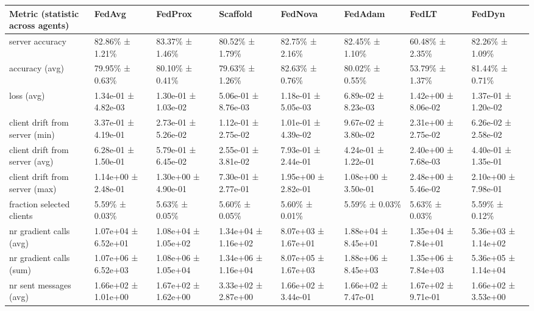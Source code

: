 \begin{tabular}{llllllll}
\hline
 Metric (statistic across agents)   & FedAvg              & FedProx             & Scaffold            & FedNova             & FedAdam             & FedLT               & FedDyn              \\
\hline
 server accuracy                    & 82.86\% ± 1.21\%      & 83.37\% ± 1.46\%      & 80.52\% ± 1.79\%      & 82.75\% ± 2.16\%      & 82.45\% ± 1.10\%      & 60.48\% ± 2.35\%      & 82.26\% ± 1.09\%      \\
 accuracy (avg)                     & 79.95\% ± 0.63\%      & 80.10\% ± 0.41\%      & 79.63\% ± 1.26\%      & 82.63\% ± 0.76\%      & 80.02\% ± 0.55\%      & 53.79\% ± 1.37\%      & 81.44\% ± 0.71\%      \\
 loss (avg)                         & 1.34e-01 ± 4.82e-03 & 1.30e-01 ± 1.03e-02 & 5.06e-01 ± 8.76e-03 & 1.18e-01 ± 5.05e-03 & 6.89e-02 ± 8.23e-03 & 1.42e+00 ± 8.06e-02 & 1.37e-01 ± 1.20e-02 \\
 client drift from server (min)     & 3.37e-01 ± 4.19e-01 & 2.73e-01 ± 5.26e-02 & 1.12e-01 ± 2.75e-02 & 1.01e-01 ± 4.39e-02 & 9.67e-02 ± 3.80e-02 & 2.31e+00 ± 2.75e-02 & 6.26e-02 ± 2.58e-02 \\
 client drift from server (avg)     & 6.28e-01 ± 1.50e-01 & 5.79e-01 ± 6.45e-02 & 2.55e-01 ± 3.81e-02 & 7.93e-01 ± 2.44e-01 & 4.24e-01 ± 1.22e-01 & 2.40e+00 ± 7.68e-03 & 4.40e-01 ± 1.35e-01 \\
 client drift from server (max)     & 1.14e+00 ± 2.48e-01 & 1.30e+00 ± 4.90e-01 & 7.30e-01 ± 2.77e-01 & 1.95e+00 ± 2.82e-01 & 1.08e+00 ± 3.50e-01 & 2.48e+00 ± 5.46e-02 & 2.10e+00 ± 7.98e-01 \\
 fraction selected clients          & 5.59\% ± 0.03\%       & 5.63\% ± 0.05\%       & 5.60\% ± 0.05\%       & 5.60\% ± 0.01\%       & 5.59\% ± 0.03\%       & 5.63\% ± 0.03\%       & 5.59\% ± 0.12\%       \\
 nr gradient calls (avg)            & 1.07e+04 ± 6.52e+01 & 1.08e+04 ± 1.05e+02 & 1.34e+04 ± 1.16e+02 & 8.07e+03 ± 1.67e+01 & 1.88e+04 ± 8.45e+01 & 1.35e+04 ± 7.84e+01 & 5.36e+03 ± 1.14e+02 \\
 nr gradient calls (sum)            & 1.07e+06 ± 6.52e+03 & 1.08e+06 ± 1.05e+04 & 1.34e+06 ± 1.16e+04 & 8.07e+05 ± 1.67e+03 & 1.88e+06 ± 8.45e+03 & 1.35e+06 ± 7.84e+03 & 5.36e+05 ± 1.14e+04 \\
 nr sent messages (avg)             & 1.66e+02 ± 1.01e+00 & 1.67e+02 ± 1.62e+00 & 3.33e+02 ± 2.87e+00 & 1.66e+02 ± 3.44e-01 & 1.66e+02 ± 7.47e-01 & 1.67e+02 ± 9.71e-01 & 1.66e+02 ± 3.53e+00 \\

\end{tabular}
